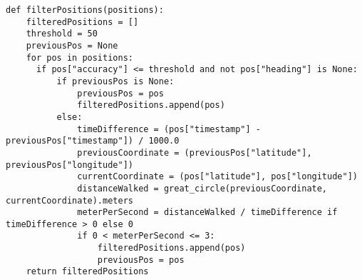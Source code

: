\begin{verbatim}
def filterPositions(positions):
	filteredPositions = []
	threshold = 50
	previousPos = None
	for pos in positions:
	  if pos["accuracy"] <= threshold and not pos["heading"] is None:
	      if previousPos is None:
	          previousPos = pos
	          filteredPositions.append(pos)
	      else:
	          timeDifference = (pos["timestamp"] - previousPos["timestamp"]) / 1000.0
	          previousCoordinate = (previousPos["latitude"], previousPos["longitude"])
	          currentCoordinate = (pos["latitude"], pos["longitude"])
	          distanceWalked = great_circle(previousCoordinate, currentCoordinate).meters
	          meterPerSecond = distanceWalked / timeDifference if timeDifference > 0 else 0
	          if 0 < meterPerSecond <= 3:
	              filteredPositions.append(pos)
	              previousPos = pos
	return filteredPositions
\end{verbatim}